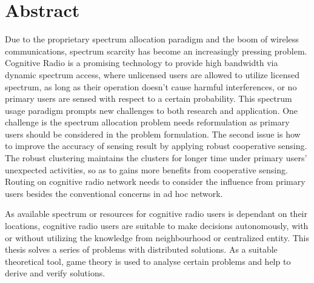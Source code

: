 \chapter{Abstract}
Due to the proprietary spectrum allocation paradigm and the boom of wireless communications, spectrum scarcity has become an increasingly pressing problem. 
Cognitive Radio is a promising technology to provide high bandwidth via dynamic spectrum access, where unlicensed users  are allowed to utilize licensed spectrum, as long as their operation doesn't cause harmful interferences, or no primary users are sensed with respect to a certain probability.
This spectrum usage paradigm prompts new challenges to both research and application.
One challenge is the spectrum allocation problem needs reformulation as primary users should be considered in the problem formulation.
The second issue is how to improve the accuracy of sensing result by applying robust cooperative sensing.
The robust clustering maintains the clusters for longer time under primary users' unexpected activities, so as to gains more benefits from cooperative sensing.
Routing on cognitive radio network needs to consider the influence from primary users besides the conventional concerns in ad hoc network.

As available spectrum or resources for cognitive radio users is dependant on their locations, cognitive radio users are suitable to make decisions autonomously, with or without utilizing the knowledge from neighbourhood or centralized entity.
This thesis solves a series of problems with distributed solutions.
As a suitable theoretical tool, game theory is used to analyse certain problems and help to derive and verify solutions.

